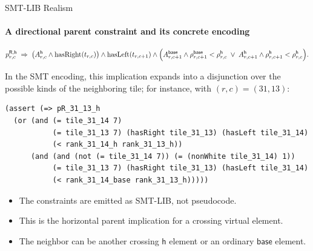 \documentclass[aspectratio=169,10pt]{beamer}
\newcommand{\kind}[1]{\mathsf{#1}}
\begin{document}
\begin{frame}[fragile]{SMT-LIB Realism}
  \framesubtitle{A directional parent constraint and its concrete encoding}
  \[
    p^{\kind{R},\kind{h}}_{r,c}\;\Rightarrow\;\bigl(A^{\kind{h}}_{r,c}\wedge \mathrm{hasRight}(t_{r,c})\bigr)\wedge\mathrm{hasLeft}(t_{r,c+1})\wedge\Bigl(A^{\kind{base}}_{r,c+1}\wedge \rho^{\kind{base}}_{r,c+1}<\rho^{\kind{h}}_{r,c}\;\vee\;A^{\kind{h}}_{r,c+1}\wedge \rho^{\kind{h}}_{r,c+1}<\rho^{\kind{h}}_{r,c}\Bigr).
  \]

  In the SMT encoding, this implication expands into a disjunction over
  the possible kinds of the neighboring tile; for instance, with
  \((r,c)=(31,13)\):
\begin{center}
\begin{minipage}{0.75\textwidth}
\begin{lstlisting}
(assert (=> pR_31_13_h
  (or (and (= tile_31_14 7)
           (= tile_31_13 7) (hasRight tile_31_13) (hasLeft tile_31_14)
           (< rank_31_14_h rank_31_13_h))
      (and (and (not (= tile_31_14 7)) (= (nonWhite tile_31_14) 1))
           (= tile_31_13 7) (hasRight tile_31_13) (hasLeft tile_31_14)
           (< rank_31_14_base rank_31_13_h)))))
\end{lstlisting}
\end{minipage}
\end{center}
  \begin{itemize}
    \item The constraints are emitted as SMT-LIB, not pseudocode.
    \item This is the horizontal parent implication for a crossing virtual element.
    \item The neighbor can be another crossing \(\kind{h}\) element or an ordinary \(\kind{base}\) element.
  \end{itemize}
\end{frame}
\end{document}
